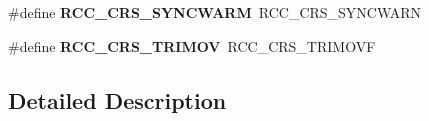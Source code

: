 \begin{DoxyCompactItemize}
\item 
\hypertarget{group___h_a_l___r_c_c___aliased_ga891dba525c7131dc45cd727be5964a98}{\#define {\bfseries R\-C\-C\-\_\-\-C\-R\-S\-\_\-\-S\-Y\-N\-C\-W\-A\-R\-M}~R\-C\-C\-\_\-\-C\-R\-S\-\_\-\-S\-Y\-N\-C\-W\-A\-R\-N}\label{group___h_a_l___r_c_c___aliased_ga891dba525c7131dc45cd727be5964a98}

\item 
\hypertarget{group___h_a_l___r_c_c___aliased_ga52aafca9877f3acfca85b91fca0d0ac4}{\#define {\bfseries R\-C\-C\-\_\-\-C\-R\-S\-\_\-\-T\-R\-I\-M\-O\-V}~R\-C\-C\-\_\-\-C\-R\-S\-\_\-\-T\-R\-I\-M\-O\-V\-F}\label{group___h_a_l___r_c_c___aliased_ga52aafca9877f3acfca85b91fca0d0ac4}

\end{DoxyCompactItemize}


\subsection{Detailed Description}
